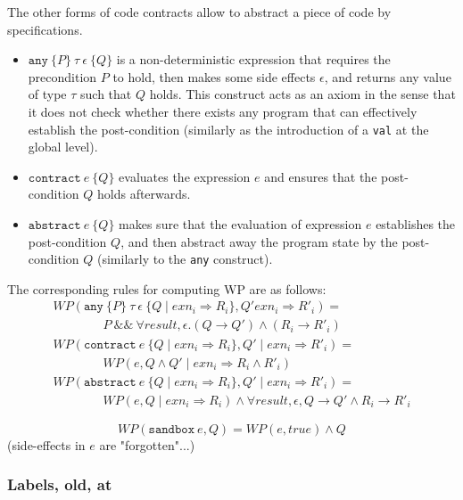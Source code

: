 The other forms of code contracts allow to abstract a piece of code by specifications.
\begin{itemize}
\item $\texttt{any}~\{ P \}~\tau~\epsilon~\{ Q \}$ is a
  non-deterministic expression that requires the precondition $P$ to
  hold, then makes some side effects $\epsilon$, and returns any value
  of type $\tau$ such that $Q$ holds. This construct acts as an axiom
  in the sense that it does not check whether there exists any program
  that can effectively establish the post-condition (similarly as the
  introduction of a \texttt{val} at the global level).
\item $\texttt{contract}~e~\{ Q \}$ evaluates the expression $e$ and
  ensures that the post-condition $Q$ holds afterwards.
\item $\texttt{abstract}~e~\{ Q \}$ makes sure that the evaluation of
  expression $e$ establishes the post-condition $Q$, and then abstract
  away the program state by the post-condition $Q$ (similarly to the
  \texttt{any} construct).
\end{itemize}
The corresponding rules for computing WP are as follows:
\[
\begin{array}{l}
  WP(\texttt{any}~\{ P \}~\tau~\epsilon~\{ Q \mid exn_i \Rightarrow R_i \} ,
  Q'  exn_i \Rightarrow R'_i) = \\
  \qquad\qquad P \mathop{\&\&} \forall result, \epsilon.
  (Q \rightarrow Q') \land (R_i \rightarrow R'_i) \\
  WP(\texttt{contract}~e~\{ Q \mid exn_i \Rightarrow R_i \} ,
  Q' \mid exn_i \Rightarrow R'_i) = \\
  \qquad\qquad WP(e,Q \land Q' \mid exn_i \Rightarrow R_i \land R'_i) \\
  WP(\texttt{abstract}~e~\{ Q \mid exn_i \Rightarrow R_i \} ,
  Q' \mid exn_i \Rightarrow R'_i) = \\
  \qquad\qquad WP(e,Q \mid exn_i \Rightarrow R_i) \land
  \forall result, \epsilon, Q \rightarrow Q' \land R_i \rightarrow R'_i
\end{array}
\]

\[
WP(\texttt{sandbox}~e, Q) = WP(e,true) \land Q
\]
(side-effects in $e$ are "forgotten"...)

\subsubsection{Labels, old, at}

\todo{}

